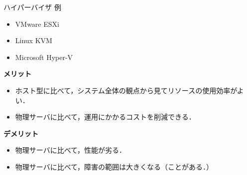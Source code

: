 \begin{frame}[t]{\ftitle}
    \begin{exampleblock}{ハイパーバイザ 例}
        \begin{itemize}
            \item VMware ESXi
            \item Linux KVM
            \item Microsoft Hyper-V
        \end{itemize}
    \end{exampleblock}
    \begin{minipage}[t]{.48\textwidth}
        \textbf{\cmark メリット}
        \begin{itemize}
            \item ホスト型に比べて，システム全体の観点から見てリソースの使用効率がよい．
            \item 物理サーバに比べて，運用にかかるコストを削減できる．
        \end{itemize}
    \end{minipage}
    \begin{minipage}[t]{.48\textwidth}
        \textbf{\xmark デメリット}
        \begin{itemize}
            \item 物理サーバに比べて，性能が劣る．
            \item 物理サーバに比べて，障害の範囲は大きくなる（ことがある．）
        \end{itemize}
    \end{minipage}\\
    \hfill\cite{itmanage}
\end{frame}
